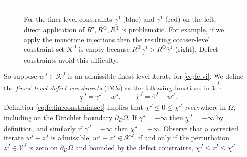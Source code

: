 \documentclass[letterpaper,final,12pt,reqno]{amsart}
\theoremstyle{cstyle}
\theoremstyle{cstyle*}
\theoremstyle{dstyle}
\numberwithin{equation}{section}
\numberwithin{figure}{section}
\numberwithin{table}{section}
\numberwithin{theorem}{section}
\newcommand{\cK}{\mathcal{K}}
\newcommand{\maxR}{R^{\bm{\oplus}}}
\newcommand{\minR}{R^{\bm{\ominus}}}
\newcommand{\iR}{R^{\bullet}}
\newcommand{\pef}[1]{\todo[inline, color=red!20]{PF: #1}}
\begin{document}
\begin{figure}[ht]
\begin{tabular}{cc}

&

\end{tabular}
\caption{For the finer-level constraints $\underline{\gamma}^1$ (blue) and $\overline{\gamma}^1$ (red) on the left, direct application of $\iR,\minR,\maxR$ is problematic.  For example, if we apply the monotone injections then the resulting coarser-level constraint set $\mathcal{K}^0$ is empty because $\maxR \underline{\gamma}^1 > \minR \overline{\gamma}^1$ (right).  Defect constraints avoid this difficulty.}
\label{fig:directRbad}
\end{figure}

So suppose $w^J \in \cK^J$ is an admissible finest-level iterate for \eqref{eq:fe:vi}.  We define the \emph{finest-level defect constraints} (DCs) \cite{GraeserKornhuber2009} as the following functions in $\tilde{\mathcal{V}}^J$:
\begin{equation}
\underline{\chi}^J = \underline{\gamma}^J - w^J, \qquad \overline{\chi}^J = \overline{\gamma}^J - w^J. \label{eq:fe:defectconstraints}
\end{equation}
Definition \eqref{eq:fe:fineconstraintset} implies that $\underline{\chi}^J \le 0 \le \overline{\chi}^J$ everywhere in $\overline{\Omega}$, including on the Dirichlet boundary $\partial_D\Omega$.  If $\underline{\gamma}^J=-\infty$ then $\underline{\chi}^J=-\infty$ by definition, and similarly if $\overline{\gamma}^J=+\infty$ then $\overline{\chi}^J=+\infty$.  Observe that a corrected iterate $w^J + z^J$ is admissible, $w^J + z^J \in \cK^J$, if and only if the perturbation $z^J \in \mathcal{V}^J$ is zero on $\partial_D\Omega$ and bounded by the defect constraints, $\underline{\chi}^J \le z^J \le \overline{\chi}^J$.
\end{document}
